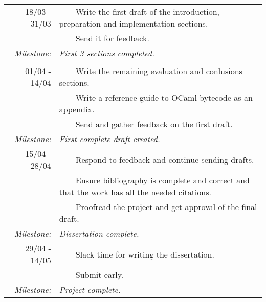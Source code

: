 \documentclass[12pt,a4paper, headings=standardclasses]{scrartcl}
\newcommand{\tabitem}{~~\llap{\textbullet}~~}
\begin{document}
\begin{tabularx}{\textwidth}{rX} \toprule

      18/03 - 31/03
       & \tabitem Write the first draft of the introduction, preparation and implementation sections.         \\
       & \tabitem Send it for feedback.                                                                       \\
      \textit{Milestone:}
       & \textit{First 3 sections completed.}                                                                 \\

       &                                                                                                      \\

      01/04 - 14/04
       & \tabitem Write the remaining evaluation and conlusions sections.                                     \\
       & \tabitem Write a reference guide to OCaml bytecode as an appendix.                                   \\
       & \tabitem Send and gather feedback on the first draft.                                                \\
      \textit{Milestone:}
       & \textit{First complete draft created.}                                                               \\

      15/04 - 28/04
       & \tabitem Respond to feedback and continue sending drafts.                                            \\
       & \tabitem Ensure bibliography is complete and correct and that the work has all the needed citations. \\
       & \tabitem Proofread the project and get approval of the final draft.                                  \\
      \textit{Milestone:}
       & \textit{Dissertation complete.}                                                                      \\
      29/04 - 14/05
       & \tabitem Slack time for writing the dissertation.                                                    \\
       & \tabitem Submit early.                                                                               \\
      \textit{Milestone:}
       & \textit{Project complete.}                                                                           \\
      \bottomrule
\end{tabularx}
\end{document}
